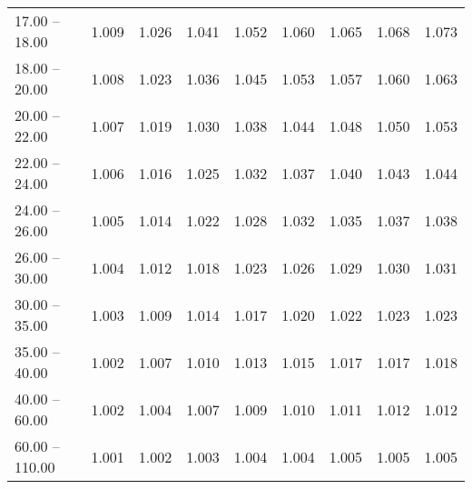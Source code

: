 \begin{table}[htp]
\begin{tiny}
\begin{center}
\begin{tabular}{|l|c|c|c|c|c|c|c|c|}
      17.00 -- 18.00 &  1.009 & 1.026 & 1.041 & 1.052 & 1.060 & 1.065 & 1.068 & 1.073 \\ 
      18.00 -- 20.00 &  1.008 & 1.023 & 1.036 & 1.045 & 1.053 & 1.057 & 1.060 & 1.063 \\ 
      20.00 -- 22.00 &  1.007 & 1.019 & 1.030 & 1.038 & 1.044 & 1.048 & 1.050 & 1.053 \\ 
      22.00 -- 24.00 &  1.006 & 1.016 & 1.025 & 1.032 & 1.037 & 1.040 & 1.043 & 1.044 \\ 
      24.00 -- 26.00 &  1.005 & 1.014 & 1.022 & 1.028 & 1.032 & 1.035 & 1.037 & 1.038 \\ 
      26.00 -- 30.00 &  1.004 & 1.012 & 1.018 & 1.023 & 1.026 & 1.029 & 1.030 & 1.031 \\ 
      30.00 -- 35.00 &  1.003 & 1.009 & 1.014 & 1.017 & 1.020 & 1.022 & 1.023 & 1.023 \\ 
      35.00 -- 40.00 &  1.002 & 1.007 & 1.010 & 1.013 & 1.015 & 1.017 & 1.017 & 1.018 \\ 
      40.00 -- 60.00 &  1.002 & 1.004 & 1.007 & 1.009 & 1.010 & 1.011 & 1.012 & 1.012 \\ 
      60.00 -- 110.00 &  1.001 & 1.002 & 1.003 & 1.004 & 1.004 & 1.005 & 1.005 & 1.005 \\ 
\hline
\end{tabular} 
             \end{center} 
             \end{tiny} 
             \label{tab:sa_offP_psi2s8} 
             \end{table}


